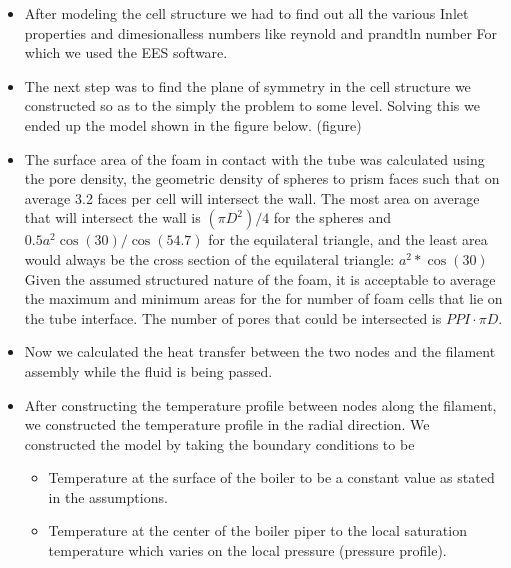 \documentclass[compileTAMUreport.tex]{subfiles}
\begin{document}
\begin{itemize}
\item After modeling the cell structure we had to find out all the various Inlet properties and dimesionalless numbers like reynold and prandtln number For which we used the EES software.
\item	The next step was to find the plane of symmetry in the cell structure we constructed so as to the simply the problem to some level. Solving this we ended up the model shown in the figure below. (figure)
\item The surface area of the foam in contact with the tube was calculated using the pore density, the geometric density of spheres to prism faces such that on average 3.2 faces per cell will intersect the wall. The most area on average that will intersect the wall is $(\pi D^2)/4$ for the spheres and $0.5 a^2 \cos (30)/ \cos(54.7)$ for the equilateral triangle, and the least area would always be the cross section of the equilateral triangle: $a^2 * \cos(30) $ Given the assumed structured nature of the foam, it is acceptable to average the maximum and minimum areas for the for number of foam cells that lie on the tube interface. The number of pores that could be intersected is $PPI\cdot\pi D$. 
\item	Now we calculated the heat transfer between the two nodes and the filament assembly while the fluid is being passed.
\item After constructing the temperature profile between nodes along the filament, we constructed the temperature profile in the radial direction. We constructed the model by taking the boundary conditions to be 
\begin{itemize}

\item Temperature at the surface of the boiler to be a constant value as stated in the assumptions.
\item Temperature at the center of the boiler piper to the local saturation temperature which varies on the local pressure (pressure profile).
\end{itemize}


\end{itemize}
\end{document}
